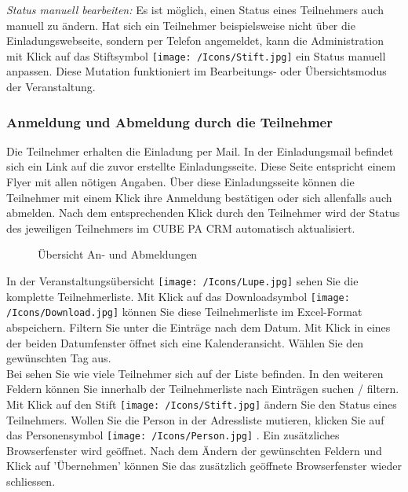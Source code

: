 \vspace{\baselineskip}

\textit{Status manuell bearbeiten:} Es ist möglich, einen Status eines Teilnehmers auch manuell zu ändern. Hat sich ein Teilnehmer beispielsweise nicht über die Einladungswebseite, sondern per Telefon angemeldet, kann die Administration mit Klick auf das Stiftsymbol \texttt{[image: /Icons/Stift.jpg]} ein Status manuell anpassen. Diese Mutation funktioniert im Bearbeitungs- oder Übersichtsmodus der Veranstaltung.

\subsubsection{Anmeldung und Abmeldung durch die Teilnehmer}

Die Teilnehmer erhalten die Einladung per Mail. In der Einladungsmail befindet sich ein Link auf die zuvor erstellte Einladungsseite. Diese Seite entspricht einem Flyer mit allen nötigen Angaben. Über diese Einladungsseite können die Teilnehmer mit einem Klick ihre Anmeldung bestätigen oder sich allenfalls auch abmelden. Nach dem entsprechenden Klick durch den Teilnehmer wird der Status des jeweiligen Teilnehmers im CUBE PA CRM automatisch aktualisiert. 

\begin{figure}[H]
\caption{Übersicht An- und Abmeldungen}
\end{figure}

In der Veranstaltungsübersicht \texttt{[image: /Icons/Lupe.jpg]} sehen Sie die komplette Teilnehmerliste. Mit Klick auf das Downloadsymbol \texttt{[image: /Icons/Download.jpg]}  können Sie diese Teilnehmerliste im Excel-Format abspeichern. Filtern Sie unter  die Einträge nach dem Datum. Mit Klick in eines der beiden Datumfenster öffnet sich eine Kalenderansicht. Wählen Sie den gewünschten Tag aus. \\
Bei  sehen Sie wie viele Teilnehmer sich auf der Liste befinden. In den weiteren Feldern  können Sie innerhalb der Teilnehmerliste nach Einträgen suchen / filtern. Mit Klick auf den Stift \texttt{[image: /Icons/Stift.jpg]}  ändern Sie den Status eines Teilnehmers. Wollen Sie die Person in der Adressliste mutieren, klicken Sie auf das Personensymbol \texttt{[image: /Icons/Person.jpg]} . Ein zusätzliches Browserfenster wird geöffnet. Nach dem Ändern der gewünschten Feldern und Klick auf 'Übernehmen' können Sie das zusätzlich geöffnete Browserfenster wieder schliessen. 

